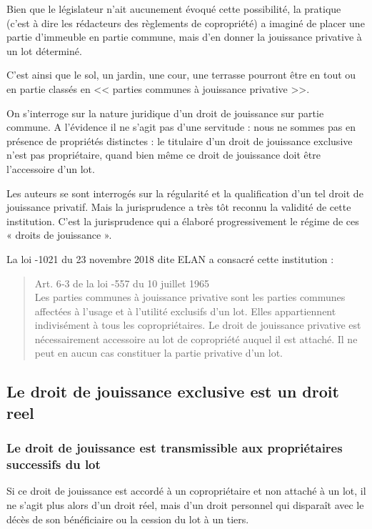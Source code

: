 	Bien que le législateur n’ait aucunement évoqué cette possibilité, la pratique (c’est à dire les rédacteurs
	des règlements de copropriété) a imaginé de placer une partie d’immeuble en partie commune, mais d’en
	donner la jouissance privative à un lot déterminé.

	C’est ainsi que le sol, un jardin, une cour, une terrasse pourront être en tout ou en partie classés en
	<< parties communes à jouissance privative >>.
	
	On s’interroge sur la nature juridique d’un droit de jouissance sur partie commune. A l’évidence il ne s’agit
	pas d’une servitude : nous ne sommes pas en présence de propriétés distinctes : le titulaire d’un droit de
	jouissance exclusive n’est pas propriétaire, quand bien même ce droit de jouissance doit être l’accessoire
	d’un lot.
	
	Les auteurs se sont interrogés sur la régularité et la qualification d’un tel droit de jouissance privatif. Mais
	la jurisprudence a très tôt reconnu la validité de cette institution. C’est la jurisprudence qui a élaboré
	progressivement le régime de ces « droits de jouissance ».
	
	La loi -1021 du 23 novembre 2018 dite ELAN a consacré cette institution :
	\begin{quote}
		Art. 6‑3 de la loi -557 du 10 juillet 1965 \\
		Les parties communes à jouissance privative sont les parties communes affectées à l’usage et
		à l’utilité exclusifs d’un lot. Elles appartiennent indivisément à tous les copropriétaires. Le droit
		de jouissance privative est nécessairement accessoire au lot de copropriété auquel il est
		attaché. Il ne peut en aucun cas constituer la partie privative d’un lot.
	\end{quote}
	
	\subsection{Le droit de jouissance exclusive est un droit reel}
	
		\subsubsection{Le droit de jouissance est transmissible aux propriétaires successifs du lot}
		
			Si ce droit de jouissance est accordé à un copropriétaire et non attaché à un lot, il ne s’agit plus alors d’un
			droit réel, mais d’un droit personnel qui disparaît avec le décès de son bénéficiaire ou la cession du lot à
			un tiers.
			
